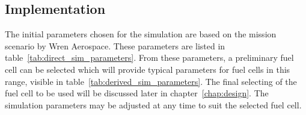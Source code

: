 \subsection{Implementation}
The initial parameters chosen for the simulation are based on the mission scenario by Wren Aerospace. These parameters are listed in table~\ref{tab:direct_sim_parameters}. From these parameters, a preliminary fuel cell can be selected which will provide typical parameters for fuel cells in this range, visible in table~\ref{tab:derived_sim_parameters}. The final selecting of the fuel cell to be used will be discussed later in chapter~\ref{chap:design}. The simulation parameters may be adjusted at any time to suit the selected fuel cell.

\newcommand{\simpar}[3]{#1 & #2 & #3\\}


